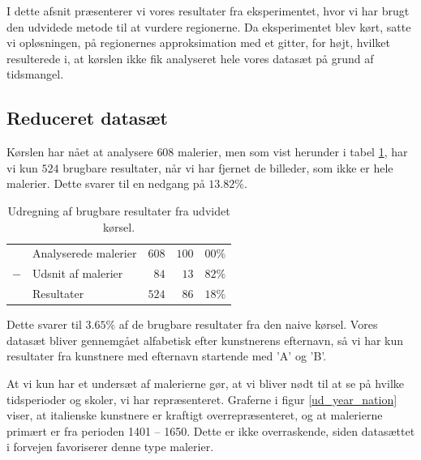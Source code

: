 {
{\sffamily I dette afsnit præsenterer vi vores resultater fra
eksperimentet, hvor vi har brugt den udvidede metode til at vurdere
regionerne. Da eksperimentet blev kørt, satte vi opløsningen, på
regionernes approksimation med et gitter, for højt, hvilket resulterede
i, at kørslen ikke fik analyseret hele vores datasæt på grund af
tidsmangel.
}

\subsection{Reduceret datasæt}
Kørslen har nået at analysere $608$ malerier, men som vist herunder i
tabel \ref{ud_tabel_fjern_detaljer}, har vi kun $524$ brugbare
resultater, når vi har fjernet de billeder, som ikke er hele malerier.
Dette svarer til en nedgang på $13.82\%$.

\begin{table}[H]
    \centering
    \begin{tabular}{r@{\ \ }p{12em}r|r@{.}l}
            & Analyserede malerier & $608$ & $100$ & $00\%$   \\
        $-$ & Udsnit af malerier   &  $84$ &  $13$ & $82\%$   \\\hline
            & Resultater           & $524$ &  $86$ & $18\%$
    \end{tabular}
    \caption[]{Udregning af brugbare resultater fra udvidet kørsel.}
    \label{ud_tabel_fjern_detaljer}
\end{table}

Dette svarer til $3.65\%$ af de brugbare resultater fra den
naive kørsel. Vores datasæt bliver gennemgået alfabetisk efter
kunstnerens efternavn, så vi har kun resultater fra kunstnere med
efternavn startende med 'A' og 'B'.

At vi kun har et undersæt af malerierne gør, at vi bliver nødt til at se
på hvilke tidsperioder og skoler, vi har repræsenteret. Graferne
i figur \ref{ud_year_nation} viser, at italienske kunstnere er kraftigt
overrepræsenteret, og at malerierne primært er fra perioden 1401 --
1650. Dette er ikke overraskende, siden datasættet i forvejen
favoriserer denne type malerier.

}
